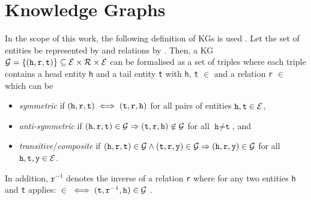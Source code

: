 \section{Knowledge Graphs} 
\label{sec:knowledge_graphs}
%
In the scope of this work, the following definition of \acp{KG} is used \cite{ConEx, RotatE}.
Let the set of entities be represented by \entities and relations by \relations.
Then, a \ac{KG} $\mathcal{G}= \{(\texttt{h}, \texttt{r}, \texttt{t}) \}  \subseteq \mathcal{E} \times \mathcal{R} \times \mathcal{E}$ can be formalised as a set of triples where each triple contains a head entity \texttt{h} and a tail entity \texttt{t} with \texttt{h}, \texttt{t} $\in$ \entities and a relation \texttt{r} $\in$ \relations which can be \cite{ConEx}
\begin{itemize}
    \item 
    \emph{symmetric} if $(\texttt{h}, \texttt{r}, \texttt{t}) \iff (\texttt{t}, \texttt{r}, \texttt{h})$ for all pairs of entities $\texttt{h},\texttt{t}\in \mathcal{E}$, 
   
   \item 
   \emph{anti-symmetric} if $(\texttt{h}, \texttt{r}, \texttt{t}) \in \mathcal{G} \Rightarrow (\texttt{t}, \texttt{r}, \texttt{h}) \not \in \mathcal{G}$ for all $\texttt{h} \not= \texttt{t}$, and
    
    \item 
    \emph{transitive}/\emph{composite} if $(\texttt{h}, \texttt{r}, \texttt{t})\in\mathcal{G} \wedge (\texttt{t}, \texttt{r}, \texttt{y}) \in \mathcal{G}  \Rightarrow (\texttt{h}, \texttt{r}, \texttt{y}) \in \mathcal{G}$ for all $\texttt{h},\texttt{t},\texttt{y}\in \mathcal{E}$.
\end{itemize}
In addition, $\texttt{r}^{-1}$ denotes the inverse of a relation \texttt{r} where for any two entities \texttt{h} and \texttt{t} applies: 
 $\in$ \kg $\iff (\texttt{t},\texttt{r}^{-1},\texttt{h}) \in \mathcal{G}$ \cite{ConEx}.